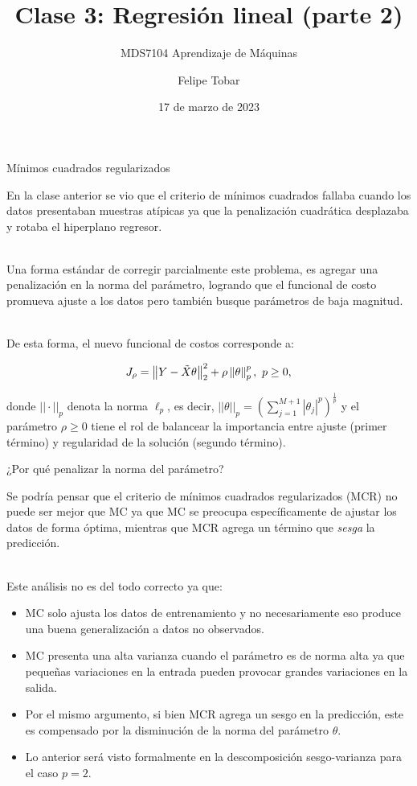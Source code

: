 \documentclass[handout, 9pt]{beamer}
\title{Clase 3: Regresión lineal (parte 2)}
\subtitle{MDS7104 Aprendizaje de Máquinas}
\date{17 de marzo de 2023}
\author{Felipe Tobar}
\institute{Iniciativa de Datos e Inteligencia Artificial\\Universidad de Chile}
\begin{document}
\begin{frame}
  \titlepage
\end{frame}

\begin{frame}{Mínimos cuadrados regularizados}

En la clase anterior se vio que el criterio de mínimos cuadrados fallaba cuando los datos presentaban muestras atípicas ya que la penalización cuadrática desplazaba y rotaba el hiperplano regresor.\\~\ \pause

Una forma estándar de corregir parcialmente este problema, es agregar una penalización en la norma del parámetro, logrando que el funcional de costo promueva ajuste a los datos pero también busque parámetros de baja magnitud.\\~\ \pause

De esta forma, el nuevo funcional de costos corresponde a:

\begin{equation*}
	J_\rho = \left\lVert Y-\tilde{X}\theta\right\rVert_2^2 + \rho\left\lVert\theta\right\rVert_p^p,\ p\geq 0,
\end{equation*}

donde $||\cdot||_p$ denota la norma $\ell_p$, es decir, $||\theta||_p=\left(\sum\limits_{j=1}^{M+1}|\theta_j|^p\right)^\frac{1}{p}$ y el parámetro $\rho\geq0$ tiene el rol de balancear la importancia entre ajuste (primer término) y regularidad de la solución (segundo término).
	 
\end{frame}

\begin{frame}{¿Por qué penalizar la norma del parámetro?}

Se podría pensar que el criterio de mínimos cuadrados regularizados (MCR) no puede ser mejor que MC ya que MC se preocupa específicamente de ajustar los datos de forma óptima, mientras que MCR agrega un término que \emph{sesga} la predicción.\\~\ \pause

Este análisis no es del todo correcto ya que: 

\begin{itemize}
	\item MC solo ajusta los datos de entrenamiento y no necesariamente eso produce una buena generalización a datos no observados.\pause
	\item MC presenta una alta varianza cuando el parámetro es de norma alta ya que pequeñas variaciones en la entrada pueden provocar grandes variaciones en la salida.\pause
	\item Por el mismo argumento, si bien MCR agrega un sesgo en la predicción, este es compensado por la disminución de la norma del parámetro $\theta$.\pause
	\item Lo anterior será visto formalmente en la descomposición sesgo-varianza para el caso $p=2$.
\end{itemize}
	
\end{frame}
\end{document}
